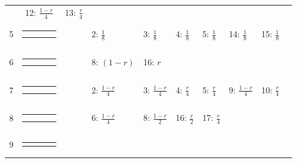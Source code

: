\documentclass[9pt,letterpaper,twoside]{article}
\begin{document}
{\begin{center}
\begin{tabular}{ccclllllll}
& 12: $\frac{1-r}{4}$
& 13: $\frac{r}{4}$
& & \\
5 &
{\renewcommand{\arraystretch}{0.3}
\renewcommand{\tabcolsep}{0.5mm}
\parbox[b][3mm][c]{12mm}{
\begin{tabular}{|p{2mm}|p{2mm}||p{2mm}|p{2mm}|} \hline
$\bullet$ &           & $\bullet$ &           \\
          & $\bullet$ &           & $\circ  $ \\ \hline
\end{tabular}}}
&
& 2: $\frac{1}{8}$
& 3: $\frac{1}{8}$
& 4: $\frac{1}{8}$
& 5: $\frac{1}{8}$
& 14: $\frac{1}{8}$
& 15: $\frac{1}{8}$
& \\
6 &
{\renewcommand{\arraystretch}{0.3}
\renewcommand{\tabcolsep}{0.5mm}
\parbox[b][3mm][c]{12mm}{
\begin{tabular}{|p{2mm}|p{2mm}||p{2mm}|p{2mm}|} \hline
$\bullet$ &           &           &           \\
$\bullet$ & $\circ  $ &           &           \\ \hline
\end{tabular}}}
&
& 8: $(1-r)$
& 16: $r$
& & & & & \\
7 &
{\renewcommand{\arraystretch}{0.3}
\renewcommand{\tabcolsep}{0.5mm}
\parbox[b][3mm][c]{12mm}{
\begin{tabular}{|p{2mm}|p{2mm}||p{2mm}|p{2mm}|} \hline
$\bullet$ & $\bullet$ &           &           \\
$\bullet$ &           & $\circ  $ &           \\ \hline
\end{tabular}}}
&
& 2: $\frac{1-r}{4}$
& 3: $\frac{1-r}{4}$
& 4: $\frac{r}{4}$
& 5: $\frac{r}{4}$
& 9: $\frac{1-r}{4}$
& 10: $\frac{r}{4}$
& \\
8 &
{\renewcommand{\arraystretch}{0.3}
\renewcommand{\tabcolsep}{0.5mm}
\parbox[b][3mm][c]{12mm}{
\begin{tabular}{|p{2mm}|p{2mm}||p{2mm}|p{2mm}|} \hline
$\bullet$ &           &           &           \\
$\bullet$ &           & $\circ  $ &           \\ \hline
\end{tabular}}}
&
& 6: $\frac{1-r}{4}$
& 8: $\frac{1-r}{2}$
& 16: $\frac{r}{2}$
& 17: $\frac{r}{4}$
& & & \\
9 &
{\renewcommand{\arraystretch}{0.3}
\renewcommand{\tabcolsep}{0.5mm}
\parbox[b][3mm][c]{12mm}{
\begin{tabular}{|p{2mm}|p{2mm}||p{2mm}|p{2mm}|} \hline
$\bullet$ &           & $\bullet$ &           \\

\end{tabular}}}
\end{tabular}
\end{center}}
\end{document}
